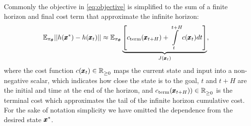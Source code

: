 Commonly the objective in \eqref{eq:objective} is simplified to the sum of a finite horizon and final cost term that approximate the infinite horizon:
\begin{equation} \label{eq:value_function}
    \mathbb{E}_{\pi_{\boldsymbol{\theta}}} || h(\pmb{x}^*) - h(\pmb{x}_t)|| \approx
    \mathbb{E}_{\pi_{\boldsymbol{\theta}}} \underbrace{\left[ 
    c_{\text{term}}(\pmb{x}_{t + H}) + \int\limits_{t}^{t + H} c(\pmb{x}_t) dt \right]}_{J(\pmb{x}_t)},
\end{equation}
where the cost function $c(\pmb{x}_t) \in \mathbb{R}^{}_{\geq 0}$ maps the current state and input into a non-negative scalar, which indicates how close the state is to the goal, $t$ and $t + H$ are the initial and time at the end of the horizon, and $c_{\text{term}}(\pmb{x}_{t+H}))  \in \mathbb{R}^{}_{\geq 0}$ is the terminal cost which approximates the tail of the infinite horizon cumulative cost. For the sake of notation simplicity we have omitted the dependence from the desired state $\pmb{x}^*$.

